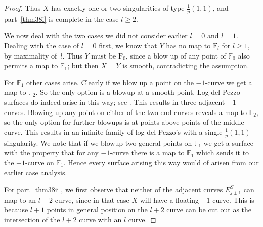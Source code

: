 \documentclass[11pt]{amsbook}
\theoremstyle{definition}
\theoremstyle{definition}
\theoremstyle{definition}
\theoremstyle{definition}
\theoremstyle{definition}
\theoremstyle{definition}
\theoremstyle{definition}
\theoremstyle{definition}
\newcommand{\ldp}{log del Pezzo}
\newcommand{\mb}[1]{\mathbb{#1}}
\newcommand{\F}{\mathrm{F}}
\begin{document}
\begin{proof}
Thus $X$ has exactly one or two singularities of type $\frac{1}p(1,1)$,
and part~\eqref{thm38i} is complete in the case $l\ge2$.


We now deal with the two cases we did not consider earlier $l = 0$ and $l =1$. Dealing with the case of $l = 0$ first, we know that $Y$ has no map to $\F_l$ for $l\ge1$, by maximality of~$l$. Thus $Y$ must be $\F_0$, since a blow up of any point of $\mb{F}_0$ also permits a map to $\mb{F}_1$; but then $X=Y$ is smooth, contradicting the assumption. 

For $\mb{F}_1$ other cases arise. Clearly if we blow up a point on the $-1$-curve we get a map to $\mb{F}_2$. So the only option is a blowup at a smooth point. Log del Pezzo surfaces do indeed arise in this way; see \cite[Table ??]{CP}.
This results in three adjacent $-1$-curves. Blowing up any point on either of the two end curves reveals a map to $\mb{F}_2$, so the only option for further blowups is at points above points of the middle curve.
 This results in an infinite family of \ldp's with a single $\frac{1}{p}(1,1)$ singularity. We note that if we blowup two general points on $\mb{F}_1$ we get a surface with the property that for any $-1$-curve there is a map to $\mb{F}_1$ which sends it to the $-1$-curve on $\mb{F}_1$. Hence every surface arising this way would of arisen from our earlier case analysis.





For part~\eqref{thm38ii}, we first observe that neither of the adjacent curves $E_{j\pm1}^S$ can
map to an $l+2$ curve, since in that case $X$ will have a floating $-1$-curve. This is because $l+1$ points in general position on the $l+2$ curve can be cut out as the intersection of the $l+2$ curve with an $l$ curve.



\end{proof}
\end{document}
